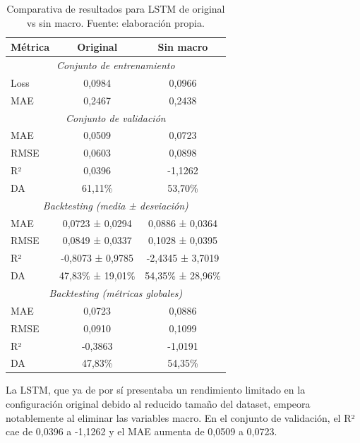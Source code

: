 \begin{enumerate}
\begin{itemize}
        \begin{table}[H]
        \centering
        \begin{tabular}{|l|c|c|}
        \hline
        \textbf{Métrica} & \textbf{Original} & \textbf{Sin macro} \\
        \hline
        \multicolumn{3}{|c|}{\textit{Conjunto de entrenamiento}} \\
        \hline
        Loss & 0,0984 & 0,0966 \\
        MAE & 0,2467 & 0,2438 \\
        \hline
        \multicolumn{3}{|c|}{\textit{Conjunto de validación}} \\
        \hline
        MAE & 0,0509 & 0,0723 \\
        RMSE & 0,0603 & 0,0898 \\
        R² & 0,0396 & -1,1262 \\
        DA & 61,11\% & 53,70\% \\
        \hline
        \multicolumn{3}{|c|}{\textit{Backtesting (media ± desviación)}} \\
        \hline
        MAE & 0,0723 ± 0,0294 & 0,0886 ± 0,0364 \\
        RMSE & 0,0849 ± 0,0337 & 0,1028 ± 0,0395 \\
        R² & -0,8073 ± 0,9785 & -2,4345 ± 3,7019 \\
        DA & 47,83\% ± 19,01\% & 54,35\% ± 28,96\% \\
        \hline
        \multicolumn{3}{|c|}{\textit{Backtesting (métricas globales)}} \\
        \hline
        MAE & 0,0723 & 0,0886 \\
        RMSE & 0,0910 & 0,1099 \\
        R² & -0,3863 & -1,0191 \\
        DA & 47,83\% & 54,35\% \\
        \hline
        \end{tabular}
        \label{tab:experimento_lstm}
        \caption{Comparativa de resultados para LSTM de original vs sin macro. Fuente: elaboración propia.}
        \end{table}

        La LSTM, que ya de por sí presentaba un rendimiento limitado en la configuración original debido al reducido tamaño del dataset, empeora notablemente al eliminar las variables macro. En el conjunto de validación, el R² cae de 0,0396 a -1,1262 y el MAE aumenta de 0,0509 a 0,0723.


\end{itemize}
\end{enumerate}
